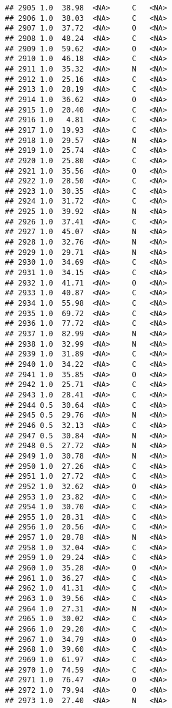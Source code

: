 \documentclass[
]{article}
\begin{document}
\begin{verbatim}
## 2905 1.0  38.98  <NA>     C   <NA>
## 2906 1.0  38.03  <NA>     C   <NA>
## 2907 1.0  37.72  <NA>     O   <NA>
## 2908 1.0  48.24  <NA>     C   <NA>
## 2909 1.0  59.62  <NA>     O   <NA>
## 2910 1.0  46.18  <NA>     C   <NA>
## 2911 1.0  35.32  <NA>     N   <NA>
## 2912 1.0  25.16  <NA>     C   <NA>
## 2913 1.0  28.19  <NA>     C   <NA>
## 2914 1.0  36.62  <NA>     O   <NA>
## 2915 1.0  20.40  <NA>     C   <NA>
## 2916 1.0   4.81  <NA>     C   <NA>
## 2917 1.0  19.93  <NA>     C   <NA>
## 2918 1.0  29.57  <NA>     N   <NA>
## 2919 1.0  25.74  <NA>     C   <NA>
## 2920 1.0  25.80  <NA>     C   <NA>
## 2921 1.0  35.56  <NA>     O   <NA>
## 2922 1.0  28.50  <NA>     C   <NA>
## 2923 1.0  30.35  <NA>     C   <NA>
## 2924 1.0  31.72  <NA>     C   <NA>
## 2925 1.0  39.92  <NA>     N   <NA>
## 2926 1.0  37.41  <NA>     C   <NA>
## 2927 1.0  45.07  <NA>     N   <NA>
## 2928 1.0  32.76  <NA>     N   <NA>
## 2929 1.0  29.71  <NA>     N   <NA>
## 2930 1.0  34.69  <NA>     C   <NA>
## 2931 1.0  34.15  <NA>     C   <NA>
## 2932 1.0  41.71  <NA>     O   <NA>
## 2933 1.0  40.87  <NA>     C   <NA>
## 2934 1.0  55.98  <NA>     C   <NA>
## 2935 1.0  69.72  <NA>     C   <NA>
## 2936 1.0  77.72  <NA>     C   <NA>
## 2937 1.0  82.99  <NA>     N   <NA>
## 2938 1.0  32.99  <NA>     N   <NA>
## 2939 1.0  31.89  <NA>     C   <NA>
## 2940 1.0  34.22  <NA>     C   <NA>
## 2941 1.0  35.85  <NA>     O   <NA>
## 2942 1.0  25.71  <NA>     C   <NA>
## 2943 1.0  28.41  <NA>     C   <NA>
## 2944 0.5  30.64  <NA>     C   <NA>
## 2945 0.5  29.76  <NA>     N   <NA>
## 2946 0.5  32.13  <NA>     C   <NA>
## 2947 0.5  30.84  <NA>     N   <NA>
## 2948 0.5  27.72  <NA>     N   <NA>
## 2949 1.0  30.78  <NA>     N   <NA>
## 2950 1.0  27.26  <NA>     C   <NA>
## 2951 1.0  27.72  <NA>     C   <NA>
## 2952 1.0  32.62  <NA>     O   <NA>
## 2953 1.0  23.82  <NA>     C   <NA>
## 2954 1.0  30.70  <NA>     C   <NA>
## 2955 1.0  28.31  <NA>     C   <NA>
## 2956 1.0  20.56  <NA>     C   <NA>
## 2957 1.0  28.78  <NA>     N   <NA>
## 2958 1.0  32.04  <NA>     C   <NA>
## 2959 1.0  29.24  <NA>     C   <NA>
## 2960 1.0  35.28  <NA>     O   <NA>
## 2961 1.0  36.27  <NA>     C   <NA>
## 2962 1.0  41.31  <NA>     C   <NA>
## 2963 1.0  39.56  <NA>     C   <NA>
## 2964 1.0  27.31  <NA>     N   <NA>
## 2965 1.0  30.02  <NA>     C   <NA>
## 2966 1.0  29.20  <NA>     C   <NA>
## 2967 1.0  34.79  <NA>     O   <NA>
## 2968 1.0  39.60  <NA>     C   <NA>
## 2969 1.0  61.97  <NA>     C   <NA>
## 2970 1.0  74.59  <NA>     C   <NA>
## 2971 1.0  76.47  <NA>     O   <NA>
## 2972 1.0  79.94  <NA>     O   <NA>
## 2973 1.0  27.40  <NA>     N   <NA>

\end{verbatim}
\end{document}

